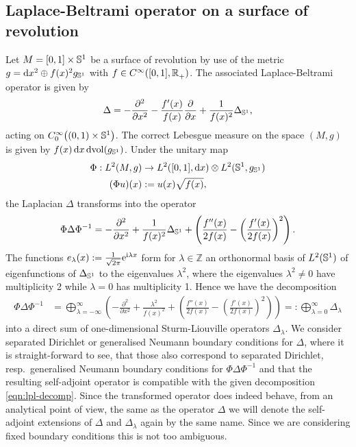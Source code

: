 \subsection{Laplace-Beltrami operator on a surface of revolution}
Let $M = [0,1]\times\Sphere{1}$ be a surface of revolution by use of the metric
$g = \mathrm dx^2 \oplus f(x)^2 g_\Sphere{1}$ with $f\in \Cinf([0,1],
\Rplus)$. The associated Laplace-Beltrami operator is given by
\begin{align}
  \Delta = -\frac{\partial^2}{\partial x^2} -
            \frac{f'(x)}{f(x)}\frac{\partial}{\partial x} +
            \frac{1}{f(x)^2}\Delta_\Sphere1,
\end{align}
acting on $\Cinf[0]\bigl((0,1)\times\Sphere1\bigr)$. The correct Lebesgue
measure on the space $(M,g)$ is given by $f(x)\,\mathrm dx\, \mathrm
d\!\vol(g_\Sphere1)$. Under the unitary map
\begin{align*}
  \Phi: L^2(M, g)&\to L^2([0,1], \mathrm dx)\otimes L^2(\Sphere1, g_\Sphere1) \\
     (\Phi u)(x) &:= u(x) \sqrt{f(x)},
\end{align*}
the Laplacian $\Delta$ transforms into the operator
\begin{align*}
  \Phi\Delta\Phi^{-1} = -\frac{\partial^2}{\partial x^2} +
  \frac{1}{f(x)^2}\Delta_\Sphere1 + \left( \frac{f''(x)}{2f(x)} -
  \left(\frac{f'(x)}{2f(x)}\right)^2\right).
\end{align*}
The functions $e_\lambda(x) := \frac{1}{\sqrt{2\pi}}\Eto{\mathrm i\lambda x}$
form for $\lambda\in\mathbb{Z}$ an orthonormal basis of $L^2(\Sphere1)$ of
eigenfunctions of $\Delta_\Sphere1$ to the eigenvalues $\lambda^2$, where the
eigenvalues $\lambda^2 \neq 0$ have multiplicity 2 while $\lambda = 0$ has
multiplicity 1. Hence we have the decomposition
\begin{align}
  \label{eqn:lpl-decomp}
  \Phi\Delta\Phi^{-1} &= \bigoplus_{\lambda=-\infty}^{\infty} \left(
    -\frac{\partial^2}{\partial x^2} + \frac{\lambda^2}{f(x)^2} + 
     \left( \frac{f''(x)}{2f(x)} -
     \left(\frac{f'(x)}{2f(x)}\right)^2\right)\right)
     =: \bigoplus_{\lambda=0}^{\infty}\Delta_\lambda
\end{align}
into a direct sum of one-dimensional Sturm-Liouville operators $\Delta_\lambda$.
We consider separated Dirichlet or generalised Neumann boundary conditions for
$\Delta$, where it is straight-forward to see, that those also correspond to
separated Dirichlet, resp.\ generalised Neumann boundary conditions for
$\Phi\Delta\Phi^{-1}$ and that the resulting self-adjoint operator is compatible
with the given decomposition \eqref{eqn:lpl-decomp}. Since the transformed
operator does indeed behave, from an analytical point of view, the same as the
operator $\Delta$ we will denote the self-adjoint extensions of $\Delta$ and
$\Delta_\lambda$ again by the same name. Since we are considering fixed boundary
conditions this is not too ambiguous.

